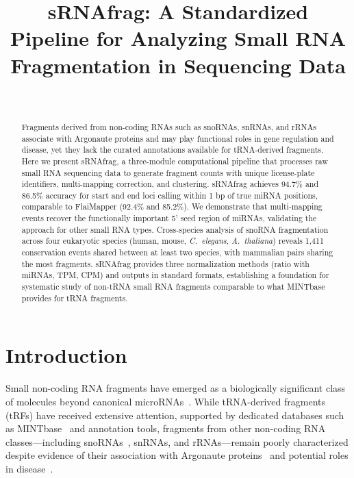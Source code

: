 \documentclass[11pt]{article}
\title{sRNAfrag: A Standardized Pipeline for Analyzing Small RNA Fragmentation in Sequencing Data}
\author{~}
\date{}
\begin{document}
\maketitle

\begin{abstract}
Fragments derived from non-coding RNAs such as snoRNAs, snRNAs, and rRNAs associate with Argonaute proteins and may play functional roles in gene regulation and disease, yet they lack the curated annotations available for tRNA-derived fragments.  Here we present sRNAfrag, a three-module computational pipeline that processes raw small RNA sequencing data to generate fragment counts with unique license-plate identifiers, multi-mapping correction, and clustering.  sRNAfrag achieves 94.7\% and 86.5\% accuracy for start and end loci calling within 1 bp of true miRNA positions, comparable to FlaiMapper (92.4\% and 85.2\%).  We demonstrate that multi-mapping events recover the functionally important 5' seed region of miRNAs, validating the approach for other small RNA types.  Cross-species analysis of snoRNA fragmentation across four eukaryotic species (human, mouse, \emph{C.\ elegans}, \emph{A.\ thaliana}) reveals 1,411 conservation events shared between at least two species, with mammalian pairs sharing the most fragments.  sRNAfrag provides three normalization methods (ratio with miRNAs, TPM, CPM) and outputs in standard formats, establishing a foundation for systematic study of non-tRNA small RNA fragments comparable to what MINTbase provides for tRNA fragments.
\end{abstract}

\section{Introduction}

Small non-coding RNA fragments have emerged as a biologically significant class of molecules beyond canonical microRNAs~\citep{bartel2004micrornas}.  While tRNA-derived fragments (tRFs) have received extensive attention, supported by dedicated databases such as MINTbase~\citep{loher2017mintbase,loher2017mintmap} and annotation tools, fragments from other non-coding RNA classes---including snoRNAs~\citep{taft2009small,falaleeva2016dual}, snRNAs, and rRNAs---remain poorly characterized despite evidence of their association with Argonaute proteins~\citep{haussecker2010human,kumar2014meta} and potential roles in disease~\citep{maute2013trna,kim2017trna}.
\end{document}
